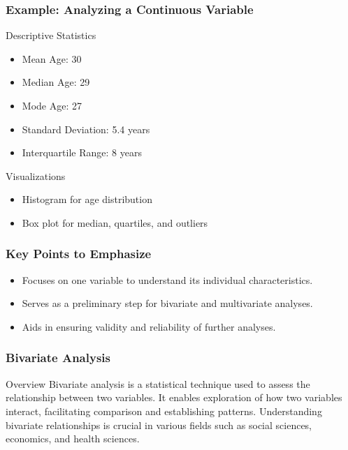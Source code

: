 \documentclass{beamer}
\begin{document}
\begin{frame}[fragile]
    \frametitle{Example: Analyzing a Continuous Variable}
    \begin{block}{Descriptive Statistics}
        \begin{itemize}
            \item Mean Age: 30
            \item Median Age: 29
            \item Mode Age: 27
            \item Standard Deviation: 5.4 years
            \item Interquartile Range: 8 years
        \end{itemize}
    \end{block}
    
    \begin{block}{Visualizations}
        \begin{itemize}
            \item Histogram for age distribution
            \item Box plot for median, quartiles, and outliers
        \end{itemize}
    \end{block}
\end{frame}

\begin{frame}[fragile]
    \frametitle{Key Points to Emphasize}
    \begin{itemize}
        \item Focuses on one variable to understand its individual characteristics.
        \item Serves as a preliminary step for bivariate and multivariate analyses.
        \item Aids in ensuring validity and reliability of further analyses.
    \end{itemize}
\end{frame}

\begin{frame}[fragile]
    \frametitle{Bivariate Analysis}
    \begin{block}{Overview}
        Bivariate analysis is a statistical technique used to assess the relationship between two variables. 
        It enables exploration of how two variables interact, facilitating comparison and establishing patterns.
        Understanding bivariate relationships is crucial in various fields such as social sciences, economics, and health sciences.
    \end{block}
\end{frame}
\end{document}
